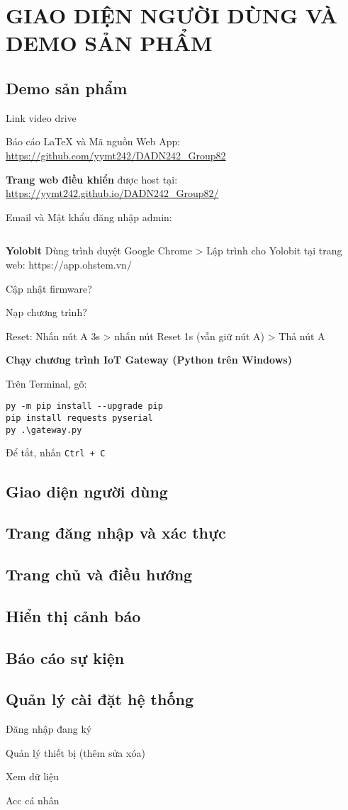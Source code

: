 \newpage
\section{GIAO DIỆN NGƯỜI DÙNG VÀ DEMO SẢN PHẨM}

\subsection{Demo sản phẩm}

Link video drive

Báo cáo LaTeX và Mã nguồn Web App: \url{https://github.com/yymt242/DADN242_Group82}

\textbf{Trang web điều khiển} được host tại: \url{https://yymt242.github.io/DADN242_Group82/}

Email và Mật khẩu đăng nhập admin:

\begin{lstlisting}[style=pythonstyle]

\end{lstlisting}

\textbf{Yolobit}
Dùng trình duyệt Google Chrome > Lập trình cho Yolobit tại trang web: https://app.ohstem.vn/

Cập nhật firmware?

Nạp chương trình?

Reset: Nhấn nút A 3s > nhấn nút Reset 1s (vẫn giữ nút A) > Thả nút A

\textbf{Chạy chương trình IoT Gateway (Python trên Windows)}

Trên Terminal, gõ:
\begin{lstlisting}[style=pythonstyle]
py -m pip install --upgrade pip
pip install requests pyserial
py .\gateway.py
\end{lstlisting}

Để tắt, nhấn \texttt{Ctrl + C}

\subsection{Giao diện người dùng}

\subsection{Trang đăng nhập và xác thực}
\subsection{Trang chủ và điều hướng}
\subsection{Hiển thị cảnh báo}
\subsection{Báo cáo sự kiện}
\subsection{Quản lý cài đặt hệ thống}




Đăng nhập đang ký

Quản lý thiết bị (thêm sửa xóa)

Xem dữ liệu

Acc cá nhân